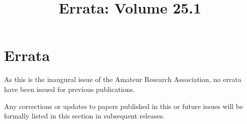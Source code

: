\documentclass[conference, compsoc, 11pt]{IEEEtran}
\title{Errata: Volume 25.1}
\author{
    \IEEEauthorblockN{Ivan Anishchuk}
    \IEEEauthorblockA{
        ivan@ivananishchuk.net https://ivananishchuk.work \\
	ORCID \orcidicon{0009-0008-8729-6137}: 0009-0008-8729-6137 %
    }
}
\begin{document}
\IEEEoverridecommandlockouts
{}

\maketitle

\IEEEpubidadjcol

\section*{Errata}

As this is the inaugural issue of the Amateur Research Association, no errata have been issued for previous publications.

Any corrections or updates to papers published in this or future issues will be formally listed in this section in subsequent releases.
\end{document}
